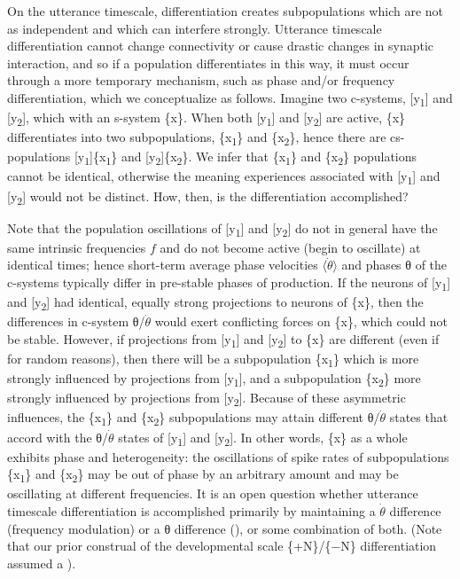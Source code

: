  On the utterance timescale, differentiation creates subpopulations which are not as independent and which can interfere strongly. Utterance timescale differentiation cannot change connectivity or cause drastic changes in synaptic interaction, and so if a population differentiates in this way, it must occur through a more temporary mechanism, such as phase and/or frequency differentiation, which we conceptualize as follows. Imagine two c-systems, [y\textsubscript{1}] and [y\textsubscript{2}], which  with an s-system \{x\}. When both [y\textsubscript{1}] and [y\textsubscript{2}] are active, \{x\} differentiates into two subpopulations, \{x\textsubscript{1}\} and \{x\textsubscript{2}\}, hence there are cs-populations [y\textsubscript{1}]\{x\textsubscript{1}\} and [y\textsubscript{2}]\{x\textsubscript{2}\}. We infer that \{x\textsubscript{1}\} and \{x\textsubscript{2}\} populations cannot be identical, otherwise the meaning experiences associated with [y\textsubscript{1}] and [y\textsubscript{2}] would not be distinct. How, then, is the differentiation accomplished? 

  Note that the population oscillations of [y\textsubscript{1}] and [y\textsubscript{2}] do not in general have the same intrinsic frequencies $f$ and do not become active (begin to oscillate) at identical times; hence short-term average phase velocities $\langle\dot{\theta}\rangle$ and phases θ of the c-systems typically differ in pre-stable phases of production. If the neurons of [y\textsubscript{1}] and [y\textsubscript{2}] had identical, equally strong projections to neurons of \{x\}, then the differences in c-system θ/$\dot{\theta}$ would exert conflicting forces on \{x\}, which could not be stable. However, if projections from [y\textsubscript{1}] and [y\textsubscript{2}] to \{x\} are different (even if for random reasons), then there will be a subpopulation \{x\textsubscript{1}\} which is more strongly influenced by projections from [y\textsubscript{1}], and a subpopulation \{x\textsubscript{2}\} more strongly influenced by projections from [y\textsubscript{2}]. Because of these asymmetric influences, the \{x\textsubscript{1}\} and \{x\textsubscript{2}\} subpopulations may attain different θ/$\dot{\theta}$ states that accord with the θ/$\dot{\theta}$ states of [y\textsubscript{1}] and [y\textsubscript{2}]. In other words, \{x\} as a whole exhibits phase and  heterogeneity: the oscillations of spike rates of subpopulations \{x\textsubscript{1}\} and \{x\textsubscript{2}\} may be out of phase by an arbitrary amount and may be oscillating at different frequencies. It is an open question whether utterance timescale differentiation is accomplished primarily by maintaining a $\dot{\theta}$ difference (frequency modulation) or a θ difference (), or some combination of both. (Note that our prior construal of the developmental scale \{+N\}/\{−N\} differentiation assumed a ).

